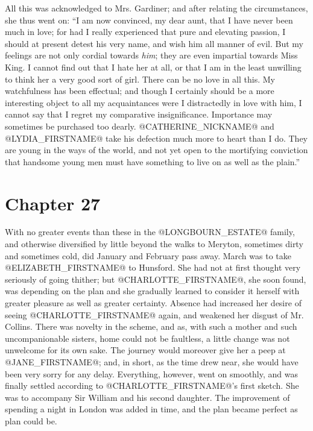 All this was acknowledged to Mrs. Gardiner; and after relating the
circumstances, she thus went on: ``I am now convinced, my dear aunt, that
I have never been much in love; for had I really experienced that pure
and elevating passion, I should at present detest his very name, and
wish him all manner of evil. But my feelings are not only cordial
towards \textit{him}; they are even impartial towards Miss King. I cannot find
out that I hate her at all, or that I am in the least unwilling to
think her a very good sort of girl. There can be no love in all this. My
watchfulness has been effectual; and though I certainly should be a more
interesting object to all my acquaintances were I distractedly in love
with him, I cannot say that I regret my comparative insignificance.
Importance may sometimes be purchased too dearly. @CATHERINE_NICKNAME@ and @LYDIA_FIRSTNAME@ take
his defection much more to heart than I do. They are young in the
ways of the world, and not yet open to the mortifying conviction that
handsome young men must have something to live on as well as the plain.''



\chapter*{Chapter 27}


With no greater events than these in the @LONGBOURN_ESTATE@ family, and otherwise
diversified by little beyond the walks to Meryton, sometimes dirty and
sometimes cold, did January and February pass away. March was to take
@ELIZABETH_FIRSTNAME@ to Hunsford. She had not at first thought very seriously of
going thither; but @CHARLOTTE_FIRSTNAME@, she soon found, was depending on the plan
and she gradually learned to consider it herself with greater pleasure
as well as greater certainty. Absence had increased her desire of seeing
@CHARLOTTE_FIRSTNAME@ again, and weakened her disgust of Mr. Collins. There
was novelty in the scheme, and as, with such a mother and such
uncompanionable sisters, home could not be faultless, a little change
was not unwelcome for its own sake. The journey would moreover give her
a peep at @JANE_FIRSTNAME@; and, in short, as the time drew near, she would have
been very sorry for any delay. Everything, however, went on smoothly,
and was finally settled according to @CHARLOTTE_FIRSTNAME@'s first sketch. She was
to accompany Sir William and his second daughter. The improvement
of spending a night in London was added in time, and the plan became
perfect as plan could be.

